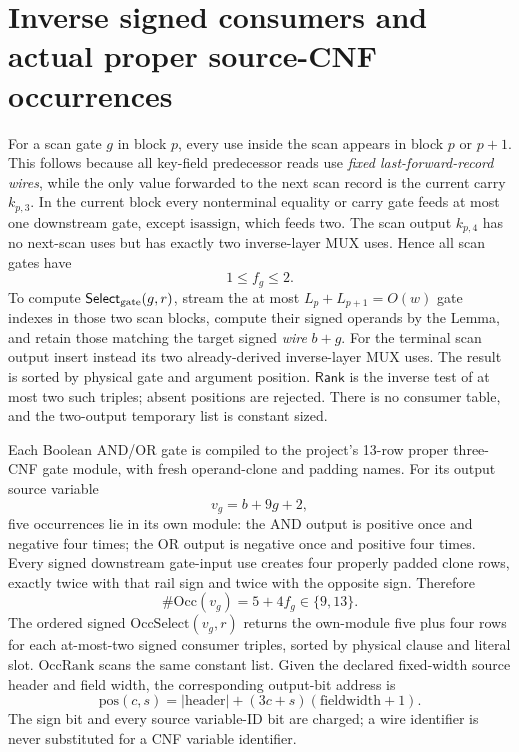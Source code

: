 \documentclass[11pt]{article}
\newcommand{\Select}{\mathsf{Select}}
\newcommand{\Rank}{\mathsf{Rank}}
\begin{document}
\section{Inverse signed consumers and actual proper source-CNF occurrences}
For a scan gate $g$ in block $p$, every use inside the scan appears in block $p$ or $p+1$. This follows because all key-field predecessor reads use \emph{fixed last-forward-record wires}, while the only value forwarded to the next scan record is the current carry $k_{p,3}$. In the current block every nonterminal equality or carry gate feeds at most one downstream gate, except $\mathrm{isassign}$, which feeds two. The scan output $k_{p,4}$ has no next-scan uses but has exactly two inverse-layer MUX uses. Hence all scan gates have
\[
\boxed{1\le f_g\le2.}\tag{5}
\]
To compute \(\Select_{\rm gate}(g,r)\), stream the at most $L_p+L_{p+1}=O(w)$ gate indexes in those two scan blocks, compute their signed operands by the Lemma, and retain those matching the target signed \emph{wire} $b+g$. For the terminal scan output insert instead its two already-derived inverse-layer MUX uses. The result is sorted by physical gate and argument position. \(\Rank\) is the inverse test of at most two such triples; absent positions are rejected. There is no consumer table, and the two-output temporary list is constant sized.

Each Boolean AND/OR gate is compiled to the project's 13-row proper three-CNF gate module, with fresh operand-clone and padding names. For its output source variable
\[
 v_g=b+9g+2,\tag{6}
\]
five occurrences lie in its own module: the AND output is positive once and negative four times; the OR output is negative once and positive four times. Every signed downstream gate-input use creates four properly padded clone rows, exactly twice with that rail sign and twice with the opposite sign. Therefore
\[
\#\mathrm{Occ}(v_g)=5+4f_g\in\{9,13\}.\tag{7}
\]
The ordered signed \(\mathrm{OccSelect}(v_g,r)\) returns the own-module five plus four rows for each at-most-two signed consumer triples, sorted by physical clause and literal slot. \(\mathrm{OccRank}\) scans the same constant list. Given the declared fixed-width source header and field width, the corresponding output-bit address is
\[
 \mathrm{pos}(c,s)=|\mathrm{header}|+(3c+s)(\mathrm{fieldwidth}+1).\tag{8}
\]
The sign bit and every source variable-ID bit are charged; a wire identifier is never substituted for a CNF variable identifier.
\end{document}

